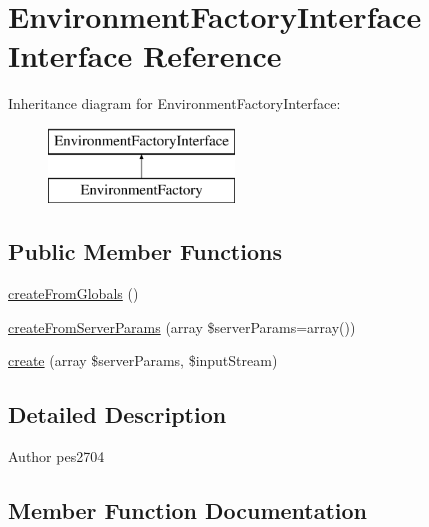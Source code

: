 \hypertarget{interface_pes_1_1_http_1_1_factory_1_1_environment_factory_interface}{}\section{Environment\+Factory\+Interface Interface Reference}
\label{interface_pes_1_1_http_1_1_factory_1_1_environment_factory_interface}
Inheritance diagram for Environment\+Factory\+Interface\+:\begin{figure}[H]
\begin{center}
\leavevmode
\includegraphics[height=2.000000cm]{interface_pes_1_1_http_1_1_factory_1_1_environment_factory_interface}
\end{center}
\end{figure}
\subsection*{Public Member Functions}
\begin{DoxyCompactItemize}
\item 
\mbox{\hyperlink{interface_pes_1_1_http_1_1_factory_1_1_environment_factory_interface_a0c9fd6ecd2d19d53bdbaa89c08428564}{create\+From\+Globals}} ()
\item 
\mbox{\hyperlink{interface_pes_1_1_http_1_1_factory_1_1_environment_factory_interface_aaf064f4cfd8fa6ba2e87755aa7f03b26}{create\+From\+Server\+Params}} (array \$server\+Params=array())
\item 
\mbox{\hyperlink{interface_pes_1_1_http_1_1_factory_1_1_environment_factory_interface_a33804929de8d2b0b9d198957b8ffaf0a}{create}} (array \$server\+Params, \$input\+Stream)
\end{DoxyCompactItemize}


\subsection{Detailed Description}
\begin{DoxyAuthor}{Author}
pes2704 
\end{DoxyAuthor}


\subsection{Member Function Documentation}
\mbox{\label{interface_pes_1_1_http_1_1_factory_1_1_environment_factory_interface_a33804929de8d2b0b9d198957b8ffaf0a}} 
